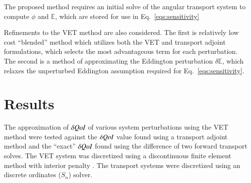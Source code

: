 \documentclass{anstrans}
\newcommand{\bra}{\left\langle}
\newcommand{\ket}{\right\rangle}
\newcommand{\sbra}{\left[}
\newcommand{\sket}{\right]}
\renewcommand{\div}{\vec{\nabla} \cdot}
\newcommand{\grad}{\vec{\nabla}}
\newcommand{\vefadj}{\varphi^\dag}
\newcommand{\Edd}{\mathbb{E}}
\newcommand{\BEdd}{B}
\newcommand{\isigt}{\ell_t}
\newcommand{\qoi}{{\it QoI}\xspace}
\begin{document}
The proposed method requires an initial solve of the angular transport system to compute $\phi$ and $\Edd$, which are stored for use in Eq.~\eqref{eqs:sensitivity}

Refinements to the VET method are also considered. The first is relatively low cost ``blended'' method which utilizes both the VET and transport adjoint formulations, which selects the most advantageous term for each perturbation. The second is a method of approximating the Eddington perturbation $\delta \Edd$, which relaxes the unperturbed Eddington assumption required for Eq.~\eqref{eqs:sensitivity}.





\section{Results}
The approximation of $\delta \qoi$ of various system perturbations using the VET method were tested against the $\delta \qoi$ value found using a transport adjoint method and the ``exact'' $\delta \qoi$ found using the difference of two forward transport solves. The VET system was discretized using a discontinuous finite element method with interior penalty \cite{Arnold}. The transport systems were discretized using an discrete ordinates ($S_n$) solver.
\end{document}
